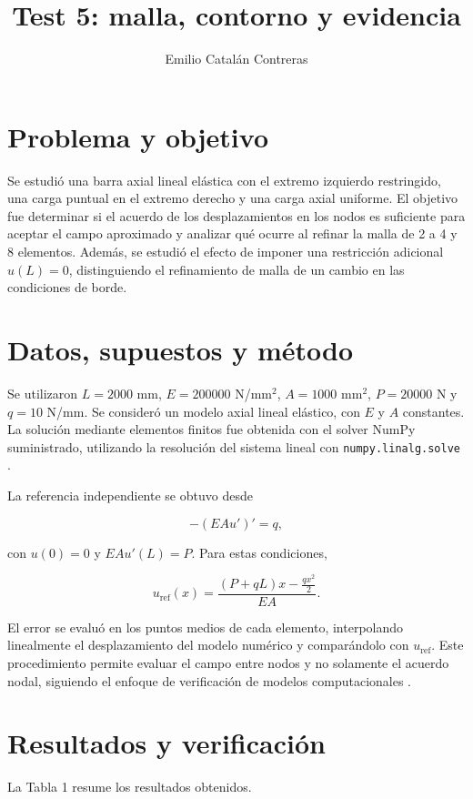 \documentclass[11pt]{article}
\title{Test 5: malla, contorno y evidencia}
\author{Emilio Catalán Contreras}
\date{}
\begin{document}
\maketitle

\section{Problema y objetivo}

Se estudió una barra axial lineal elástica con el extremo izquierdo restringido, una carga puntual en el extremo derecho y una carga axial uniforme. El objetivo fue determinar si el acuerdo de los desplazamientos en los nodos es suficiente para aceptar el campo aproximado y analizar qué ocurre al refinar la malla de 2 a 4 y 8 elementos. Además, se estudió el efecto de imponer una restricción adicional $u(L)=0$, distinguiendo el refinamiento de malla de un cambio en las condiciones de borde.

\section{Datos, supuestos y método}

Se utilizaron $L=2000$ mm, $E=200000$ N/mm$^2$, $A=1000$ mm$^2$, $P=20000$ N y $q=10$ N/mm. Se consideró un modelo axial lineal elástico, con $E$ y $A$ constantes. La solución mediante elementos finitos fue obtenida con el solver NumPy suministrado, utilizando la resolución del sistema lineal con \texttt{numpy.linalg.solve} \cite{numpy}.

La referencia independiente se obtuvo desde

\[
-(EAu')'=q,
\]

con $u(0)=0$ y $EAu'(L)=P$. Para estas condiciones,

\[
u_{\mathrm{ref}}(x)=
\frac{(P+qL)x-\frac{q x^2}{2}}{EA}.
\]

El error se evaluó en los puntos medios de cada elemento, interpolando linealmente el desplazamiento del modelo numérico y comparándolo con $u_{\mathrm{ref}}$. Este procedimiento permite evaluar el campo entre nodos y no solamente el acuerdo nodal, siguiendo el enfoque de verificación de modelos computacionales \cite{rod}.

\section{Resultados y verificación}

La Tabla 1 resume los resultados obtenidos.
\end{document}
